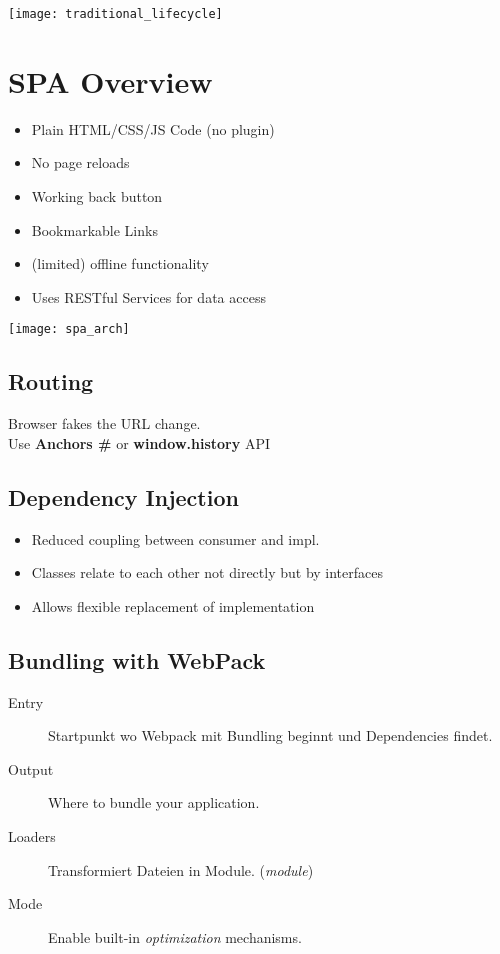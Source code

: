 

\newcommand{\TITLE}{Web Engineering 3}
\newcommand{\AUTHOR}{Mona Panchaud}
\newcommand{\INSTITUTE}{Ostschweizer Fachhochschule}




\begin{multicols*}{2}

\texttt{[image: traditional\_lifecycle]}


\section{SPA Overview}

\begin{itemize}
    \item Plain HTML/CSS/JS Code (no plugin)
    \item No page reloads
    \item Working back button
    \item Bookmarkable Links
    \item (limited) offline functionality
    \item Uses RESTful Services for data access
\end{itemize}
\texttt{[image: spa\_arch]}

\subsection{Routing}
Browser fakes the URL change.
\\
Use \textbf{Anchors \#} or \textbf{window.history} API

\subsection{Dependency Injection}
\begin{itemize}
    \item Reduced coupling between consumer and impl.
    \item Classes relate to each other not directly but by interfaces
    \item Allows flexible replacement of implementation
\end{itemize}

\subsection{Bundling with WebPack}
\begin{description}
    \item[Entry] Startpunkt wo Webpack mit Bundling beginnt und
    Dependencies findet.
    \item[Output] Where to bundle your application.
    \item[Loaders] Transformiert Dateien in Module. (\textit{module})
    \item[Mode] Enable built-in \textit{optimization} mechanisms.
\end{description}


\end{multicols*}
